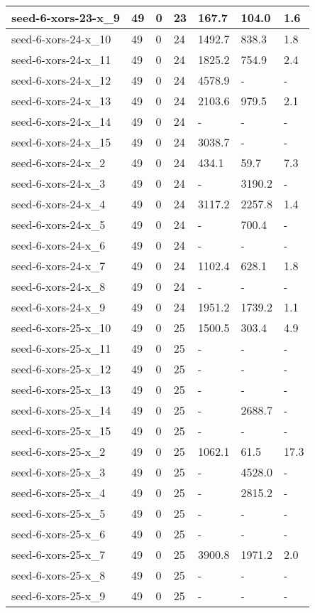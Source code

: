 \begin{scriptsize}
\begin{longtable}{|p{5cm}|l|l|l|l|l|l|}
seed-6-xors-23-x\_9&49&0&23&167.7&104.0&1.6 \\ \hline 
seed-6-xors-24-x\_10&49&0&24&1492.7&838.3&1.8 \\ \hline 
seed-6-xors-24-x\_11&49&0&24&1825.2&754.9&2.4 \\ \hline 
seed-6-xors-24-x\_12&49&0&24&4578.9&-&- \\ \hline 
seed-6-xors-24-x\_13&49&0&24&2103.6&979.5&2.1 \\ \hline 
seed-6-xors-24-x\_14&49&0&24&-&-&- \\ \hline 
seed-6-xors-24-x\_15&49&0&24&3038.7&-&- \\ \hline 
seed-6-xors-24-x\_2&49&0&24&434.1&59.7&7.3 \\ \hline 
seed-6-xors-24-x\_3&49&0&24&-&3190.2&- \\ \hline 
seed-6-xors-24-x\_4&49&0&24&3117.2&2257.8&1.4 \\ \hline 
seed-6-xors-24-x\_5&49&0&24&-&700.4&- \\ \hline 
seed-6-xors-24-x\_6&49&0&24&-&-&- \\ \hline 
seed-6-xors-24-x\_7&49&0&24&1102.4&628.1&1.8 \\ \hline 
seed-6-xors-24-x\_8&49&0&24&-&-&- \\ \hline 
seed-6-xors-24-x\_9&49&0&24&1951.2&1739.2&1.1 \\ \hline 
seed-6-xors-25-x\_10&49&0&25&1500.5&303.4&4.9 \\ \hline 
seed-6-xors-25-x\_11&49&0&25&-&-&- \\ \hline 
seed-6-xors-25-x\_12&49&0&25&-&-&- \\ \hline 
seed-6-xors-25-x\_13&49&0&25&-&-&- \\ \hline 
seed-6-xors-25-x\_14&49&0&25&-&2688.7&- \\ \hline 
seed-6-xors-25-x\_15&49&0&25&-&-&- \\ \hline 
seed-6-xors-25-x\_2&49&0&25&1062.1&61.5&17.3 \\ \hline 
seed-6-xors-25-x\_3&49&0&25&-&4528.0&- \\ \hline 
seed-6-xors-25-x\_4&49&0&25&-&2815.2&- \\ \hline 
seed-6-xors-25-x\_5&49&0&25&-&-&- \\ \hline 
seed-6-xors-25-x\_6&49&0&25&-&-&- \\ \hline 
seed-6-xors-25-x\_7&49&0&25&3900.8&1971.2&2.0 \\ \hline 
seed-6-xors-25-x\_8&49&0&25&-&-&- \\ \hline 
seed-6-xors-25-x\_9&49&0&25&-&-&- \\ \hline 

\end{longtable}
\end{scriptsize}
